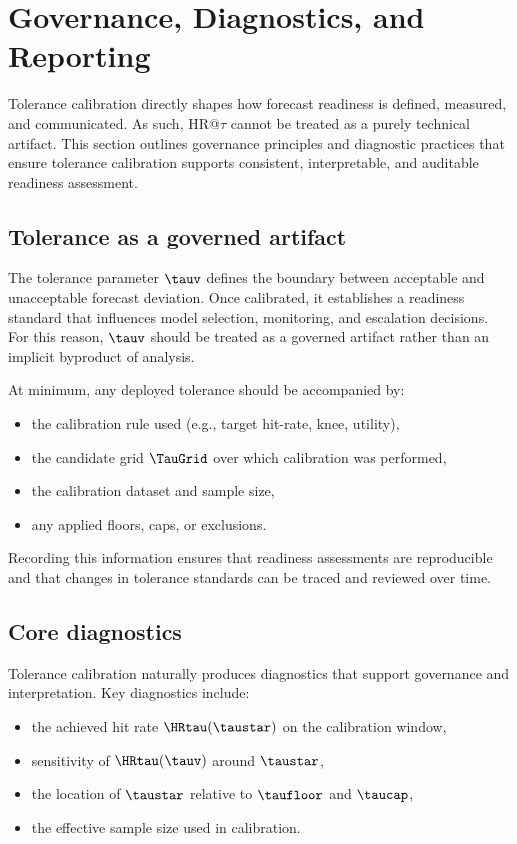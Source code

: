 \section{Governance, Diagnostics, and Reporting}
\label{sec:governance}

Tolerance calibration directly shapes how forecast readiness is defined,
measured, and communicated.
As such, HR@$\tau$ cannot be treated as a purely technical artifact.
This section outlines governance principles and diagnostic practices that ensure
tolerance calibration supports consistent, interpretable, and auditable readiness
assessment.

\subsection{Tolerance as a governed artifact}
\label{subsec:tau_governance}

The tolerance parameter $\tauv$ defines the boundary between acceptable and
unacceptable forecast deviation.
Once calibrated, it establishes a readiness standard that influences model
selection, monitoring, and escalation decisions.
For this reason, $\tauv$ should be treated as a governed artifact rather than an
implicit byproduct of analysis.

At minimum, any deployed tolerance should be accompanied by:
\begin{itemize}[leftmargin=*]
    \item the calibration rule used (e.g., target hit-rate, knee, utility),
    \item the candidate grid $\TauGrid$ over which calibration was performed,
    \item the calibration dataset and sample size,
    \item any applied floors, caps, or exclusions.
\end{itemize}

Recording this information ensures that readiness assessments are reproducible
and that changes in tolerance standards can be traced and reviewed over time.

\subsection{Core diagnostics}
\label{subsec:tau_diagnostics}

Tolerance calibration naturally produces diagnostics that support governance and
interpretation.
Key diagnostics include:
\begin{itemize}[leftmargin=*]
    \item the achieved hit rate $\HRtau(\taustar)$ on the calibration window,
    \item sensitivity of $\HRtau(\tauv)$ around $\taustar$,
    \item the location of $\taustar$ relative to $\taufloor$ and $\taucap$,
    \item the effective sample size used in calibration.
\end{itemize}

